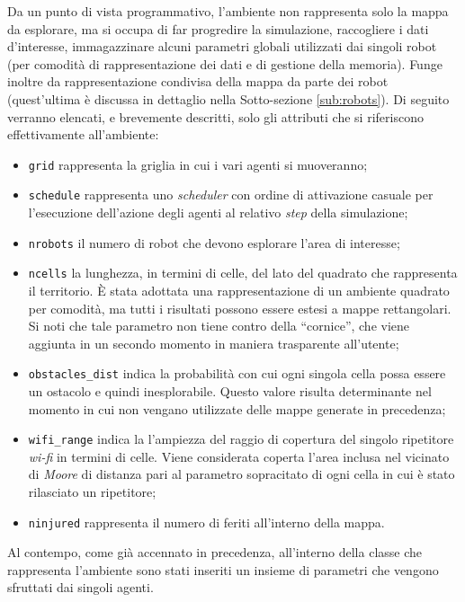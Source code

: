 Da un punto di vista programmativo, l'ambiente non rappresenta solo la mappa da esplorare, ma si occupa di far progredire la simulazione, raccogliere i dati d'interesse, immagazzinare alcuni parametri globali utilizzati dai singoli robot (per comodità di rappresentazione dei dati e di gestione della memoria). Funge inoltre da rappresentazione condivisa della mappa da parte dei robot (quest'ultima è discussa in dettaglio nella Sotto-sezione \ref{sub:robots}).
Di seguito verranno elencati, e brevemente descritti, solo gli attributi che si riferiscono effettivamente all'ambiente:
\begin{itemize}
	\item \texttt{grid} rappresenta la griglia in cui i vari agenti si muoveranno;
	\item \texttt{schedule} rappresenta uno \textit{scheduler} con ordine di attivazione casuale per l'esecuzione dell'azione degli agenti al relativo \textit{step} della simulazione;
	\item \texttt{nrobots} il numero di robot che devono esplorare l'area di interesse;
	\item \texttt{ncells} la lunghezza, in termini di celle, del lato del quadrato che rappresenta il territorio. È stata adottata una rappresentazione di un ambiente quadrato per comodità, ma tutti i risultati possono essere estesi a mappe rettangolari. Si noti che tale parametro non tiene contro della “cornice”, che viene aggiunta in un secondo momento in maniera trasparente all'utente;
	\item \texttt{obstacles\_dist} indica la probabilità con cui ogni singola cella possa essere un ostacolo e quindi inesplorabile. Questo valore risulta determinante nel momento in cui non vengano utilizzate delle mappe generate in precedenza;
	\item \texttt{wifi\_range} indica la l'ampiezza del raggio di copertura del singolo ripetitore \textit{wi-fi} in termini di celle. Viene considerata coperta l'area inclusa nel vicinato di \textit{Moore} di distanza pari al parametro sopracitato di ogni cella in cui è stato rilasciato un ripetitore;
	\item \texttt{ninjured} rappresenta il numero di feriti all'interno della mappa.
\end{itemize}
Al contempo, come già accennato in precedenza, all'interno della classe che rappresenta l'ambiente sono stati inseriti un insieme di parametri che vengono sfruttati dai singoli agenti.
